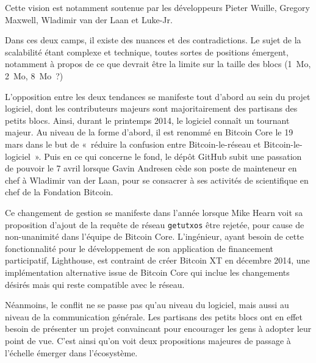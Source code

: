 Cette vision est notamment soutenue par les développeurs Pieter Wuille, Gregory Maxwell, Wladimir van der Laan et Luke-Jr.

Dans ces deux camps, il existe des nuances et des contradictions. Le sujet de la scalabilité étant complexe et technique, toutes sortes de positions émergent, notamment à propos de ce que devrait être la limite sur la taille des blocs (1~Mo, 2~Mo, 8~Mo~?)

L'opposition entre les deux tendances se manifeste tout d'abord au sein du projet logiciel, dont les contributeurs majeurs sont majoritairement des partisans des petits blocs. Ainsi, durant le printemps 2014, le logiciel connaît un tournant majeur. Au niveau de la forme d'abord, il est renommé en Bitcoin Core le 19 mars dans le but de «~réduire la confusion entre Bitcoin-le-réseau et Bitcoin-le-logiciel~». Puis en ce qui concerne le fond, le dépôt GitHub subit une passation de pouvoir le 7 avril lorsque Gavin Andresen cède son poste de mainteneur en chef à Wladimir van der Laan, pour se consacrer à ses activités de scientifique en chef de la Fondation Bitcoin.

Ce changement de gestion se manifeste dans l'année lorsque Mike Hearn voit sa proposition d'ajout de la requête de réseau \verb?getutxos? être rejetée, pour cause de non-unanimité dans l'équipe de Bitcoin Core. L'ingénieur, ayant besoin de cette fonctionnalité pour le développement de son application de financement participatif, Lighthouse, est contraint de créer Bitcoin XT en décembre 2014, une implémentation alternative issue de Bitcoin Core qui inclue les changements désirés mais qui reste compatible avec le réseau.

Néanmoins, le conflit ne se passe pas qu'au niveau du logiciel, mais aussi au niveau de la communication générale. Les partisans des petits blocs ont en effet besoin de présenter un projet convaincant pour encourager les gens à adopter leur point de vue. C'est ainsi qu'on voit deux propositions majeures de passage à l'échelle émerger dans l'écosystème.


